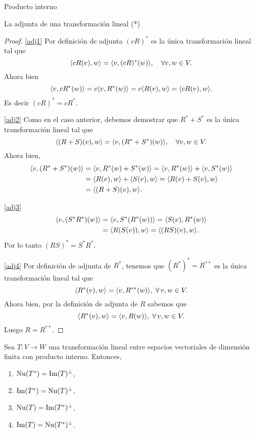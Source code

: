 \begin{chapter}{Producto interno}
\begin{section}{La adjunta de una transformaci\'on lineal (*)}
\begin{proof}
            \ref{adj1} Por definición de adjunta $(cR)^*$ es la única transformación lineal tal que
            $$
            \langle cR(v),w\rangle = \langle v,(cR)^*(w)\rangle, \quad \forall v,w \in V.
            $$
            Ahora bien
            $$
            \langle v,cR^*(w)\rangle = c\langle v,R^*(w)\rangle = c\langle R(v),w\rangle =  \langle cR(v),w\rangle. 
            $$
            Es decir $(cR)^* = cR^*$.
            
            \ref{adj2} Como en el caso anterior, debemos demostrar que  $R^* + S^*$ es la única transformación lineal tal que
            $$ 
            \langle (R+S)(v),w\rangle = \langle v,(R^* + S^*)(w)\rangle, \quad \forall v,w \in V.
            $$
            Ahora bien,
            \begin{align*}
            \langle v,(R^* + S^*)(w)\rangle &= \langle v,R^*(w) + S^*(w)\rangle =  \langle v,R^*(w) \rangle+\langle v, S^*(w)\rangle \\
            &=  \langle R(v),w \rangle+\langle S(v), w\rangle =  \langle R(v) + S(v), w\rangle \\
            &=  \langle (R+S)(v), w\rangle .
            \end{align*}

            \ref{adj3} 
            \begin{align*}
            \langle v,(S^*R^*)(w)\rangle &= \langle v, S^*(R^*(w))\rangle =  \langle S(v),R^*(w) \rangle \\
            &=  \langle R(S(v)),w \rangle =  \langle (RS)(v), w\rangle .
            \end{align*}
            Por lo tanto  $(RS)^* = S^*R^*$.
            
            \ref{adj4} Por definición de adjunta de $R^*$, tenemos que $ (R^*)^*=R^{**}$  es la única transformación lineal tal que 
            $$
            \langle R^*(v), w\rangle = \langle v, R^{**}(w)\rangle  , \; \forall\, v,w \in V.
            $$ 
            Ahora bien, por la definición de adjunta de $R$ sabemos que 
            $$
            \langle R^*(v), w\rangle = \langle v, R(w)\rangle , \; \forall\, v,w \in V.
            $$ 
            Luego $R = R^{**}$.
            
        \end{proof}
        
        
        \begin{teorema}\label{rel-adj-ort}
            Sea $T: V \to W$ una transformación lineal entre espacios vectoriales de dimensión finita con producto interno. Entonces,
            \begin{enumerate}
                \item\label{itm-nut*-imtp} $\operatorname{Nu}(T^*) = \operatorname{Im}(T)^\perp$,
                \item\label{itm-imt*-nutp} $\operatorname{Im}(T^*) = \operatorname{Nu}(T)^\perp$,
                \item\label{itm-nut-imt*p} $\operatorname{Nu}(T) = \operatorname{Im}(T^*)^\perp$,
                \item\label{itm-imt-nut*p} $\operatorname{Im}(T) = \operatorname{Nu}(T^*)^\perp$.
            \end{enumerate}
        \end{teorema}
       

\end{section}
\end{chapter}
